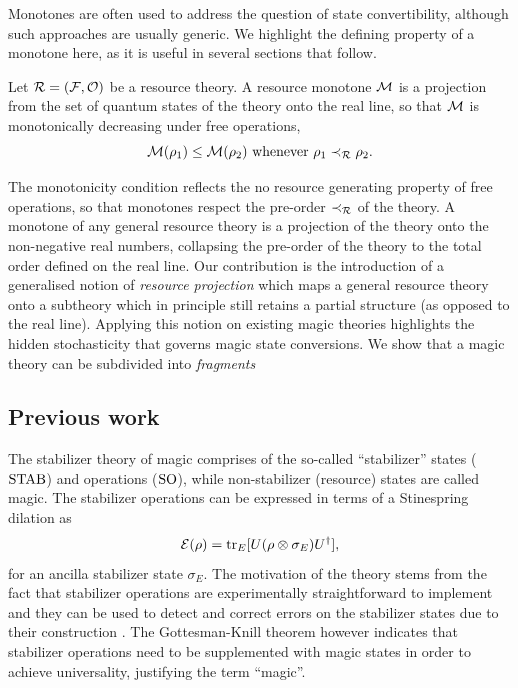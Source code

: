 \documentclass[pra,
aps,
twocolumn,
superscriptaddress,
groupedaddress,
nofootinbib,
reprint
]{revtex4-1}
\begin{document}
Monotones are often used  to address the question of state convertibility, although such approaches are usually generic.
We highlight the defining property of a monotone here, as it is useful in several sections that follow.
\begin{definition}\label{def:mono}
    Let $\mathcal{R} = (\mathcal{F}, \mathcal{O})$ be a resource theory.
    A resource monotone $\mathcal{M}$ is a projection from the set of quantum states of the theory onto the real line, so that $\mathcal{M}$ is monotonically decreasing under free operations,
    \begin{equation}
        \mathcal{M}(\rho_1) \leq \mathcal{M}(\rho_2)\ \text{whenever}\ \rho_1 \prec_{\mathcal{R}} \rho_2.
    \end{equation}
\end{definition}
The monotonicity condition reflects the no resource generating property of free operations, so that monotones respect the pre-order $\prec_{\mathcal{R}}$ of the theory.
A monotone of any general resource theory is a projection of the theory onto the non-negative real numbers, collapsing the pre-order of the theory to the total order defined on the real line.
Our contribution is the introduction of a generalised notion of \emph{resource projection} which maps a general resource theory onto a subtheory which in principle still retains a partial structure (as opposed to the real line).
Applying this notion on existing magic theories highlights the hidden stochasticity that governs magic state conversions.
We show that a magic theory can be subdivided into \emph{fragments} 

\subsection{Previous work}
\label{sec:prev}


The stabilizer theory of magic comprises of the so-called ``stabilizer'' states (${\rm{STAB}}$) and operations (${\rm{SO}}$), while non-stabilizer (resource) states are called magic.
The stabilizer operations can be expressed in terms of a Stinespring dilation as 
\begin{equation}
    \mathcal{E}(\rho) = {\rm{tr}}_E [U(\rho \otimes \sigma_E)U^\dagger],
\end{equation} 
for an ancilla stabilizer state $\sigma_E$. 
The motivation of the theory stems from the fact that stabilizer operations are experimentally straightforward to implement and they can be used to detect and correct errors on the stabilizer states due to their construction .
The Gottesman-Knill theorem however indicates that stabilizer operations need to be supplemented with magic states in order to achieve universality, justifying the term ``magic''.
\end{document}
